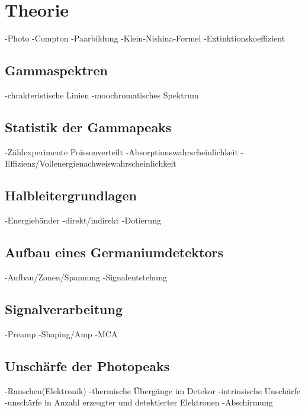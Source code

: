\section{Theorie}
\label{sec:Theorie}
-Photo
-Compton
-Paarbildung
-Klein-Nishina-Formel
-Extinktionskoeffizient
\subsection{Gammaspektren}
-chrakteristische Linien
-moochromatisches Spektrum

\subsection{Statistik der Gammapeaks}
-Zählexperimente Poissonverteilt
-Absorptionswahrscheinlichkeit
-Effizienz/Vollenergienachweiswahrscheinlichkeit
\subsection{Halbleitergrundlagen}
-Energiebänder
-direkt/indirekt
-Dotierung
\subsection{Aufbau eines Germaniumdetektors}
-Aufbau/Zonen/Spannung
-Signalentstehung

\subsection{Signalverarbeitung}
-Preamp
-Shaping/Amp
-MCA
\subsection{Unschärfe der Photopeaks}
-Rauschen(Elektronik)
-thermische Übergänge im Detekor
-intrinsische Unschärfe
-unschärfe in Anzahl erzeugter und detektierter Elektronen
-Abschirmung



